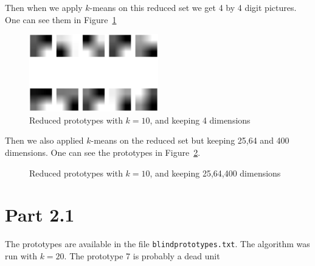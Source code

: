 \documentclass[12pt,a4paper]{article}
\begin{document}
Then when we apply $k$-means on this reduced set we get 4 by 4 digit pictures. One can see them in Figure~\ref{fig:reduced_proto}
\begin{figure}
    \centering
    \includegraphics[width=0.5\textwidth]{reduced_proto}
    \caption{Reduced prototypes with $k=10$, and keeping 4 dimensions}
    \label{fig:reduced_proto}
\end{figure}
Then we also applied $k$-means on the reduced set but keeping 25,64 and 400 dimensions. One can see the prototypes in Figure~\ref{fig:reduced_proto_dim}.
\begin{figure}
    \centering
    \caption{Reduced prototypes with $k=10$, and keeping 25,64,400 dimensions}
    \label{fig:reduced_proto_dim}
\end{figure}

\section*{Part 2.1}
The prototypes are available in the file \texttt{blindprototypes.txt}. The algorithm was run with $k=20$. The prototype 7 is probably a dead unit
\end{document}
